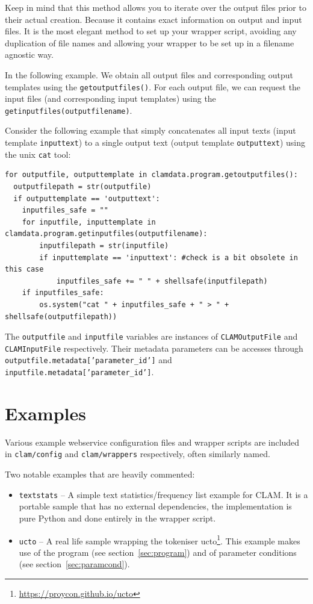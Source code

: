 \documentclass[a4paper,12pt,twoside,openright]{report}
\begin{document}
Keep in mind that this method allows you to iterate over the output files prior
to their actual creation. Because it contains exact information on output and
input files. It is the most elegant method to set up your wrapper script,
avoiding any duplication of file names and allowing your wrapper to be set up
in a filename agnostic way.

In the following example. We obtain all output files and corresponding
output templates using the \texttt{getoutputfiles()}. For each output file, we can
request the input files (and corresponding input templates) using the
\texttt{getinputfiles(outputfilename)}. 

Consider the following example that simply concatenates all input texts (input template
\texttt{inputtext}) to a single output text (output template
\texttt{outputtext}) using the unix \texttt{cat} tool:

{ \small
\begin{verbatim}
for outputfile, outputtemplate in clamdata.program.getoutputfiles():
  outputfilepath = str(outputfile)
  if outputtemplate == 'outputtext':
    inputfiles_safe = ""
    for inputfile, inputtemplate in clamdata.program.getinputfiles(outputfilename):
        inputfilepath = str(inputfile)
        if inputtemplate == 'inputtext': #check is a bit obsolete in this case
            inputfiles_safe += " " + shellsafe(inputfilepath) 
    if inputfiles_safe:
        os.system("cat " + inputfiles_safe + " > " + shellsafe(outputfilepath))
\end{verbatim}}

The \texttt{outputfile} and \texttt{inputfile} variables are instances of
\texttt{CLAMOutputFile} and \texttt{CLAMInputFile} respectively. Their metadata
parameters can be accesses through \texttt{outputfile.metadata['parameter\_id']}
and \texttt{inputfile.metadata['parameter\_id']}. 


\section{Examples}

Various example webservice configuration files and wrapper scripts are included
in \texttt{clam/config} and \texttt{clam/wrappers} respectively, often
similarly named. 

Two notable examples that are heavily commented:

\begin{itemize}
    \item \texttt{textstats} -- A simple text statistics/frequency list example
        for CLAM. It is a portable sample that has no external dependencies, the implementation is pure
        Python and done entirely in the wrapper script.
    \item \texttt{ucto} -- A real life sample wrapping the tokeniser
        ucto\footnote{\url{https://proycon.github.io/ucto}}. This example makes
        use of the program (see section~\ref{sec:program}) and of parameter
        conditions (see section~\ref{sec:paramcond}).
\end{itemize}
\end{document}
